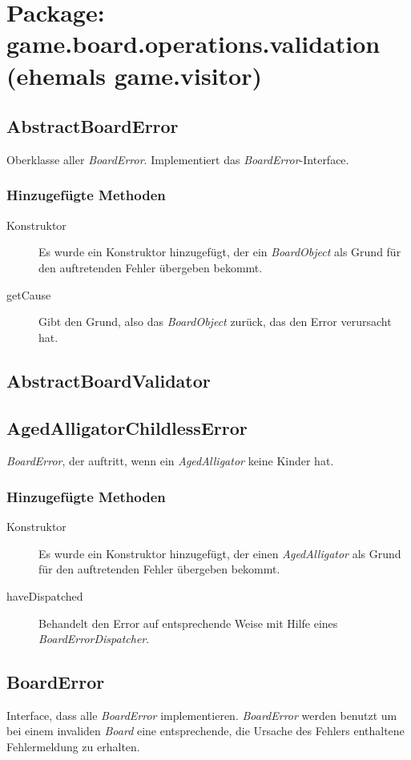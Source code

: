 \section{Package: game.board.operations.validation (ehemals game.visitor)}
\subsection{AbstractBoardError}
	Oberklasse aller \emph{BoardError}. Implementiert das \emph{BoardError}-Interface.
	\subsubsection{Hinzugefügte Methoden}
	\begin{description}
		\item[Konstruktor] Es wurde ein Konstruktor hinzugefügt, der ein \emph{BoardObject} als Grund für den auftretenden 
			Fehler übergeben bekommt.
		\item[getCause]
			Gibt den Grund, also das \emph{BoardObject} zurück, das den Error verursacht hat.
	\end{description}

\subsection{AbstractBoardValidator}

\subsection{AgedAlligatorChildlessError}
	\emph{BoardError}, der auftritt, wenn ein \emph{AgedAlligator} keine Kinder hat.
	\subsubsection{Hinzugefügte Methoden}
	\begin{description}
		\item[Konstruktor] Es wurde ein Konstruktor hinzugefügt, der einen \emph{AgedAlligator} als Grund für den auftretenden 
			Fehler übergeben bekommt.
		\item[haveDispatched]
			Behandelt den Error auf entsprechende Weise mit Hilfe eines \emph{BoardErrorDispatcher}.
	\end{description}

\subsection{BoardError}
	Interface, dass alle \emph{BoardError} implementieren. \emph{BoardError} werden benutzt um bei einem invaliden
	 \emph{Board} eine entsprechende, die Ursache des Fehlers enthaltene Fehlermeldung zu erhalten.
